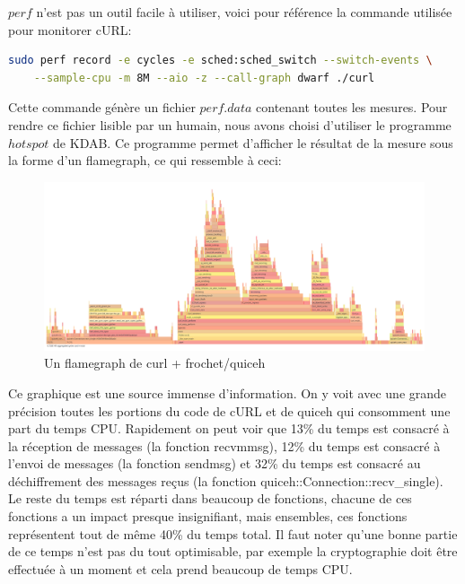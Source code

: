 $perf$ n'est pas un outil facile à utiliser, voici pour référence la commande utilisée pour monitorer cURL:

\begin{center}
    \begin{lstlisting}[language=bash]
sudo perf record -e cycles -e sched:sched_switch --switch-events \
    --sample-cpu -m 8M --aio -z --call-graph dwarf ./curl
    \end{lstlisting}
\end{center}

Cette commande génère un fichier $perf.data$ contenant toutes les mesures.
Pour rendre ce fichier lisible par un humain, nous avons choisi d'utiliser le programme $hotspot$ de KDAB.
Ce programme permet d'afficher le résultat de la mesure sous la forme d'un flamegraph, ce qui ressemble à ceci:

\begin{figure}[H]
    \centering
    \includegraphics[width=\textwidth]{figures/flamegraph_h3.png}
    \caption{Un flamegraph de curl + frochet/quiceh}
\end{figure}

Ce graphique est une source immense d'information. On y voit avec une grande précision toutes les portions du code de cURL et de quiceh qui consomment une part du temps CPU.
Rapidement on peut voir que 13\% du temps est consacré à la réception de messages (la fonction recvmmsg), 12\% du temps est consacré à l'envoi de messages (la fonction sendmsg) et 32\% du temps est consacré au déchiffrement des messages reçus (la fonction quiceh::Connection::recv\_single). Le reste du temps est réparti dans beaucoup de fonctions, chacune de ces fonctions a un impact presque insignifiant, mais ensembles, ces fonctions représentent tout de même 40\% du temps total. Il faut noter qu'une bonne partie de ce temps n'est pas du tout optimisable, par exemple la cryptographie doit être effectuée à un moment et cela prend beaucoup de temps CPU.

